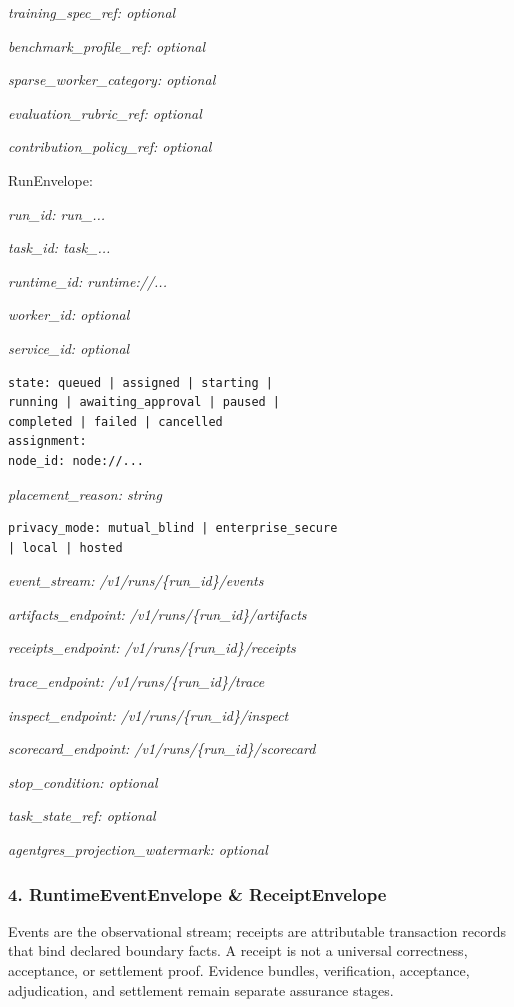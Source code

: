 \documentclass[
  11pt,
]{article}
\begin{document}
\emph{training\_spec\_ref: optional}

\emph{benchmark\_profile\_ref: optional}

\emph{sparse\_worker\_category: optional}

\emph{evaluation\_rubric\_ref: optional}

\emph{contribution\_policy\_ref: optional}

RunEnvelope:

\emph{run\_id: run\_...}

\emph{task\_id: task\_...}

\emph{runtime\_id: runtime://...}

\emph{worker\_id: optional}

\emph{service\_id: optional}

\begin{lstlisting}[language={},basicstyle=\ttfamily\scriptsize]
state: queued | assigned | starting |
running | awaiting_approval | paused |
completed | failed | cancelled
assignment:
node_id: node://...
\end{lstlisting}
\emph{placement\_reason: string}

\begin{lstlisting}[language={},basicstyle=\ttfamily\scriptsize]
privacy_mode: mutual_blind | enterprise_secure
| local | hosted
\end{lstlisting}
\emph{event\_stream: /v1/runs/\{run\_id\}/events}

\emph{artifacts\_endpoint: /v1/runs/\{run\_id\}/artifacts}

\emph{receipts\_endpoint: /v1/runs/\{run\_id\}/receipts}

\emph{trace\_endpoint: /v1/runs/\{run\_id\}/trace}

\emph{inspect\_endpoint: /v1/runs/\{run\_id\}/inspect}

\emph{scorecard\_endpoint: /v1/runs/\{run\_id\}/scorecard}

\emph{stop\_condition: optional}

\emph{task\_state\_ref: optional}

\emph{agentgres\_projection\_watermark: optional}

\hypertarget{runtimeeventenvelope-receiptenvelope}{%
\subsubsection{4. RuntimeEventEnvelope \&
ReceiptEnvelope}\label{runtimeeventenvelope-receiptenvelope}}

Events are the observational stream; receipts are attributable transaction
records that bind declared boundary facts. A receipt is not a universal
correctness, acceptance, or settlement proof. Evidence bundles, verification,
acceptance, adjudication, and settlement remain separate assurance stages.
\end{document}
